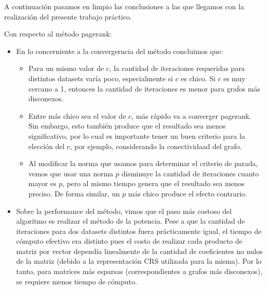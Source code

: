 A continuación pasamos en limpio las conclusiones a las que llegamos con la realización del presente trabajo práctico.

Con respecto al método pagerank:
\begin{itemize}
	\item En lo concerniente a la convergerncia del método concluimos que:
		\begin{itemize}
			\item Para un mismo valor de $c$, la cantidad de iteraciones requeridas para distintos datasets varía poco, especialmente si $c$ es chico. Si $c$ es muy cercano a 1, entonces la cantidad de iteraciones es menor para grafos más disconexos.
			\item Entre más chico sea el valor de $c$, más rápido va a converger pagerank. Sin embargo, esto también produce que el resultado sea menos significativo, por lo cual es importante tener un buen criterio para la elección del $c$, por ejemplo, considerando la conectividaad del grafo.
			\item Al modificar la norma que usamos para determinar el criterio de parada, vemos que usar una norma $p$ disminuye la cantidad de iteraciones cuanto mayor es $p$, pero al mismo tiempo genera que el resultado sea menos preciso. De forma similar, un $p$ más chico produce el efecto contrario.
		\end{itemize}
	\item Sobre la performance del método, vimos que el paso más costoso del algoritmo es realizar el método de la potencia. Pese a que la cantidad de iteraciones para dos datasets distintos fuera prácticamente igual, el tiempo de cómputo efectivo era distinto pues el costo de realizar cada producto de matriz por vector dependía linealmente de la cantidad de coeficientes no nulos de la matriz (debido a la representación CRS utilizada para la misma). Por lo tanto, para matrices más esparsas (correspondientes a grafos más disconexos), se requiere menos tiempo de cómputo.
\end{itemize}

